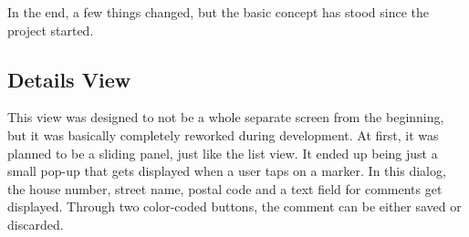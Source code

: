 In the end, a few things changed, but the basic concept has stood since the project started.

\subsection{Details View}
This view was designed to not be a whole separate screen from the beginning, but it was basically completely reworked during development. At first, it was planned to be a sliding panel, just like the list view. It ended up being just a small pop-up that gets displayed when a user taps on a marker. In this dialog, the house number, street name, postal code and a text field for comments get displayed. Through two color-coded buttons, the comment can be either saved or discarded.

\begin{figure}[H]
    \centering
    \begin{minipage}{0.3\textwidth}
        \centering

\end{minipage}
\end{figure}
